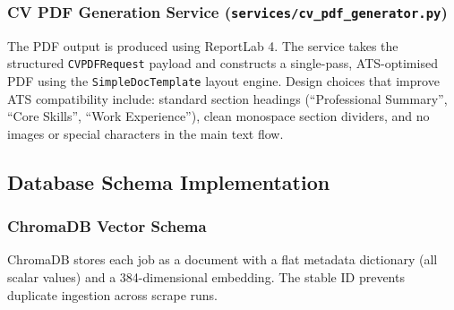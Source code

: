 \documentclass[12pt, a4paper, oneside]{report}
\begin{document}
\subsubsection*{CV PDF Generation Service (\texttt{services/cv\_pdf\_generator.py})}

The PDF output is produced using ReportLab 4. The service takes the structured
\texttt{CVPDFRequest} payload and constructs a single-pass, ATS-optimised PDF using the
\texttt{SimpleDocTemplate} layout engine. Design choices that improve ATS compatibility
include: standard section headings (``Professional Summary'', ``Core Skills'',
``Work Experience''), clean monospace section dividers, and no images or special characters
in the main text flow.

\subsection{Database Schema Implementation}
\label{sec:db-schema}

\subsubsection*{ChromaDB Vector Schema}

ChromaDB stores each job as a document with a flat metadata dictionary (all scalar values)
and a 384-dimensional embedding. The stable ID prevents duplicate ingestion across scrape
runs.
\end{document}
